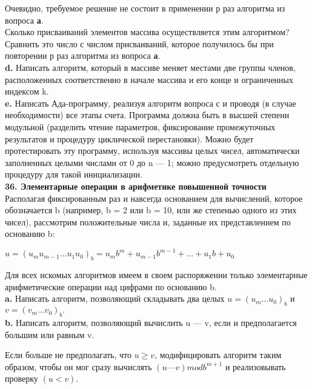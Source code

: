 Очевидно, требуемое решение не состоит в применении р раз алгоритма из вопроса \textbf{а}.\\

Сколько присваиваний элементов массива осуществляется этим алгоритмом? Сравнить это число с числом присваиваний, которое получилось бы при повторении р раз алгоритма из вопроса \textbf{а}.\\

\textbf{d.} Написать алгоритм, который в массиве меняет местами две группы членов, расположенных соответственно в начале массива и его конце и ограниченных индексом k.\\

\textbf{e.} Написать Ада-программу, реализуя алгоритм вопроса с и проводя (в случае необходимости) все этапы счета. Программа должна быть в высшей степени модульной (разделить чтение параметров, фиксирование промежуточных результатов и процедуру циклической перестановки). Можно будет протестировать эту программу, используя массивы целых чисел, автоматически заполненных целыми числами от 0 до n — 1; можно предусмотреть отдельную процедуру для такой инициализации.\\

\noindent
\textbf{36. Элементарные операции в арифметике повышенной точности}\\

Располагая фиксированным раз и навсегда основанием для вычислений, которое обозначается b (например, b = 2 или b = 10, или же степенью одного из этих чисел), рассмотрим положительные числа и, заданные их представлением по основанию b:
\begin{center}
$u = (u_{m}u_{m-1} ... u_{1}u_{0})_{b} = u_{m}b^{m} + u_{m-1}b^{m-1} + ... + u_{1}b + u_{0}$
\end{center}
Для всех искомых алгоритмов имеем в своем распоряжении только элементарные арифметические операции над цифрами по основанию b.\\

\textbf{a.} Написать алгоритм, позволяющий складывать два целых $u = (u_{m} ... u_{0})_{b}$ и $v = (v_{m} ... v_{0})_{b}.$\\

\textbf{b.} Написать алгоритм, позволяющий вычислить u — v, если и предполагается большим или равным v.
\newpage

Если больше не предполагать, что $u \geqslant v$, модифицировать алгоритм таким образом, чтобы он мог сразу вычислять $(u — v) mod b^{m+1}$ и реализовывать проверку $(u < v)$.\\

